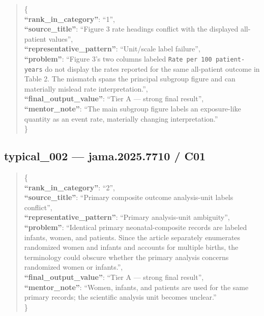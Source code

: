 \documentclass[
  letterpaper,
  9pt]{extreport}
\begin{document}
\begin{quote}
\{\\
\textbf{``rank\_in\_category''}: ``1'',\\
\textbf{``source\_title''}: ``Figure 3 rate headings conflict with the
displayed all-patient values'',\\
\textbf{``representative\_pattern''}: ``Unit/scale label failure'',\\
\textbf{``problem''}: ``Figure 3's two columns labeled
\texttt{Rate\ per\ 100\ patient-years} do not display the rates reported
for the same all-patient outcome in Table 2. The mismatch spans the
principal subgroup figure and can materially mislead rate
interpretation.'',\\
\textbf{``final\_output\_value''}: ``Tier A --- strong final result'',\\
\textbf{``mentor\_note''}: ``The main subgroup figure labels an
exposure-like quantity as an event rate, materially changing
interpretation.''\\
\}
\end{quote}

\hypertarget{typical_002--jama20257710--c01}{%
\subsection{typical\_002 --- jama.2025.7710 /
C01}\label{typical_002--jama20257710--c01}}

\begin{quote}
\{\\
\textbf{``rank\_in\_category''}: ``2'',\\
\textbf{``source\_title''}: ``Primary composite outcome analysis-unit
labels conflict'',\\
\textbf{``representative\_pattern''}: ``Primary analysis-unit
ambiguity'',\\
\textbf{``problem''}: ``Identical primary neonatal-composite records are
labeled infants, women, and patients. Since the article separately
enumerates randomized women and infants and accounts for multiple
births, the terminology could obscure whether the primary analysis
concerns randomized women or infants.'',\\
\textbf{``final\_output\_value''}: ``Tier A --- strong final result'',\\
\textbf{``mentor\_note''}: ``Women, infants, and patients are used for
the same primary records; the scientific analysis unit becomes
unclear.''\\
\}
\end{quote}
\end{document}
